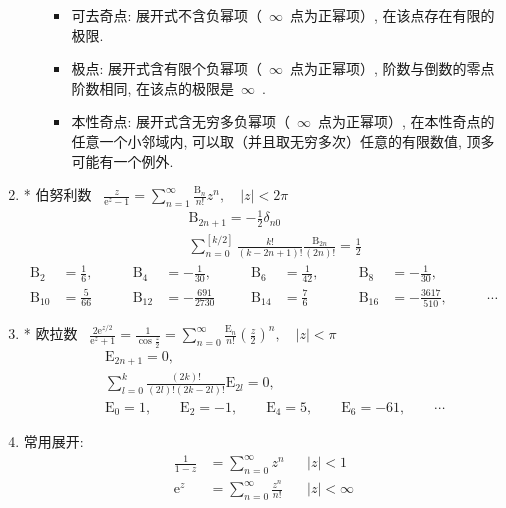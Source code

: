 \documentclass[11pt,a4paper]{article}
\renewcommand{\m}[1]{~$\displaystyle#1$~}
\newcommand\e{\mathrm{e}}
\newcommand\E{\mathrm{E}}
\newcommand{\summ}[1]{\sum_{n=#1}^\infty}
\begin{document}
\begin{enumerate}
\begin{itemize}
            \begin{itemize}
              \item 可去奇点: 展开式不含负幂项（\m{\infty}点为正幂项）, 在该点存在有限的极限.
              \item 极点: 展开式含有限个负幂项（\m{\infty}点为正幂项）, 阶数与倒数的零点阶数相同, 在该点的极限是\m{\infty}.
              \item 本性奇点: 展开式含无穷多负幂项（\m{\infty}点为正幂项）, 在本性奇点的任意一个小邻域内, 可以取（并且取无穷多次）任意的有限数值, 顶多可能有一个例外.
            \end{itemize}
        \end{itemize}
      \renewcommand\B{\ensuremath{\mathrm{B}}}
      \item* 伯努利数 \m{\frac{z}{\e^z-1} = \sum_{n=1}^{\infty} \frac {\B_n}{n!} z^n,\quad|z|<2\pi}\\
        \begin{eqnarray*}
          &&\B_{2n+1} = -\frac 12\delta_{n0} \\
          &&\sum_{n=0}^{[k/2]}\frac{k!}{(k-2n+1)!}\frac{\B_{2n}}{(2n)!} = \frac 12
        \end{eqnarray*}
        \begin{align*}
          \B_2 &= \frac 16, \qquad &\B_4 &= -\frac 1{30}, \qquad &\B_6 &= \frac 1{42}, \qquad &\B_8 &= -\frac 1{30},\\
          \B_{10} &= \frac 5{66} &\B_{12} &= -\frac {691}{2730} &\B_{14} &= \frac 76 &\B_{16} &= -\frac {3617}{510}, \qquad& \cdots
        \end{align*}
      \item* 欧拉数 \m{\frac{2\e^{z/2}}{\e^z+1} = \frac 1{\cos \frac z2} = \summ{0}\frac{\E_n}{n!}\left(\frac z2\right)^n,\quad|z|<\pi}\\
        \begin{eqnarray*}
          &&\E_{2n+1} = 0,\\
          &&\sum_{l=0}^{k}\frac {(2k)!}{(2l)!(2k-2l)!}\E_{2l} = 0,\\
          &&\E_0 = 1,\qquad \E_2 = -1,\qquad \E_4 = 5,\qquad \E_6 = -61,\qquad \cdots
        \end{eqnarray*}
      \item 常用展开:
        \begin{align*}
          \frac 1{1-z} &= \summ{0} z^n &&|z|<1\\
          \e^z &= \summ{0} \frac {z^n}{n!} &&|z|<\infty\\

\end{align*}
\end{enumerate}
\end{document}
